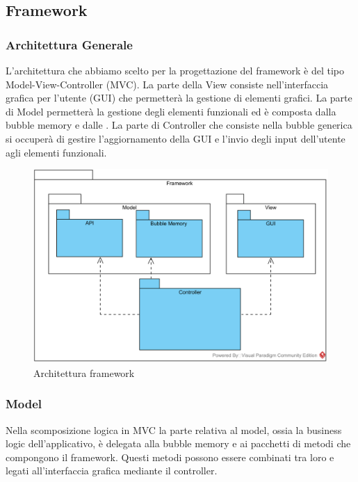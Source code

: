 \subsection{Framework}

\subsubsection{Architettura Generale}
L'architettura che abbiamo scelto per la progettazione del framework è del tipo Model-View-Controller (MVC). La parte della View consiste nell'interfaccia grafica per l'utente (GUI) che permetterà la gestione di elementi grafici. La parte di Model permetterà la gestione degli elementi funzionali ed è composta dalla bubble memory e dalle . La parte di Controller che consiste nella bubble generica si occuperà di gestire l'aggiornamento della GUI e l'invio degli input dell'utente agli elementi funzionali.

\begin{figure}[H]
	\centering
	\includegraphics[width=14cm]{diagrammi_img/classi_e_package/framework.png}
	\caption{Architettura framework}
\end{figure}

\subsubsection{Model}
Nella scomposizione logica in MVC la parte relativa al model, ossia la business logic dell'applicativo, è delegata alla bubble memory e ai pacchetti di metodi che compongono il framework. Questi metodi possono essere combinati tra loro e legati all'interfaccia grafica mediante il controller.

